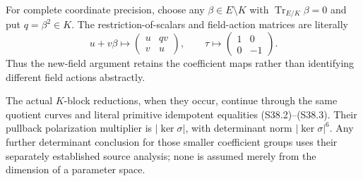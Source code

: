 For complete coordinate precision, choose any
\(\beta\in E\setminus K\) with \(\operatorname{Tr}_{E/K}\beta=0\)
and put \(q=\beta^2\in K\). The restriction-of-scalars and
field-action matrices are literally
\[
 u+v\beta\longmapsto\begin{pmatrix}u&qv\\v&u\end{pmatrix},
 \qquad\tau\longmapsto\begin{pmatrix}1&0\\0&-1\end{pmatrix}.
                                                               \tag{S39.8}
\]
Thus the new-field argument retains the coefficient maps rather
than identifying different field actions abstractly.

The actual \(K\)-block reductions, when they occur, continue
through the same quotient curves and literal primitive idempotent
equalities (S38.2)--(S38.3). Their pullback polarization multiplier
is \(|\ker\sigma|\), with determinant norm
\(|\ker\sigma|^6\). Any further determinant conclusion for
those smaller coefficient groups uses their separately established
source analysis; none is assumed merely from the dimension of a
parameter space.
